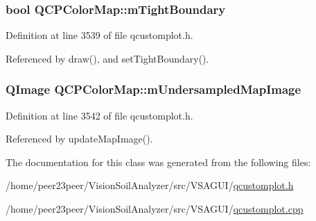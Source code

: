 \subsubsection[{m\+Tight\+Boundary}]{\setlength{\rightskip}{0pt plus 5cm}bool Q\+C\+P\+Color\+Map\+::m\+Tight\+Boundary\hspace{0.3cm}{\ttfamily [protected]}}\label{class_q_c_p_color_map_ac2e9425fe4381b496726e1c09f978302}


Definition at line 3539 of file qcustomplot.\+h.



Referenced by draw(), and set\+Tight\+Boundary().

\hypertarget{class_q_c_p_color_map_acad3d52f3572436d5f2e4057911ea8d3}{}
\subsubsection[{m\+Undersampled\+Map\+Image}]{\setlength{\rightskip}{0pt plus 5cm}Q\+Image Q\+C\+P\+Color\+Map\+::m\+Undersampled\+Map\+Image\hspace{0.3cm}{\ttfamily [protected]}}\label{class_q_c_p_color_map_acad3d52f3572436d5f2e4057911ea8d3}


Definition at line 3542 of file qcustomplot.\+h.



Referenced by update\+Map\+Image().



The documentation for this class was generated from the following files\+:\begin{DoxyCompactItemize}
\item 
/home/peer23peer/\+Vision\+Soil\+Analyzer/src/\+V\+S\+A\+G\+U\+I/\hyperlink{qcustomplot_8h}{qcustomplot.\+h}\item 
/home/peer23peer/\+Vision\+Soil\+Analyzer/src/\+V\+S\+A\+G\+U\+I/\hyperlink{qcustomplot_8cpp}{qcustomplot.\+cpp}\end{DoxyCompactItemize}
